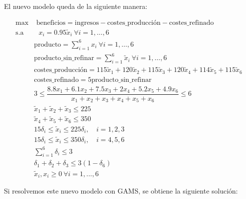 \documentclass[12pt,a4paper,twoside,openright,titlepage,final]{article}
\begin{document}
El nuevo modelo queda de la siguiente manera:

\begin{align*}
\max & \text{ beneficios} = \text{ingresos} - \text{costes\_producción} - \text{costes\_refinado}\\
\text{s.a} & \text{\ } x_i = 0.95\tilde{x}_i \ \forall i = 1, \dots, 6 \\
& \text{producto} = \sum_{i=1}^{6} x_i \ \forall i = 1, \dots, 6 \\
&\text{producto\_sin\_refinar} = \sum_{i=1}^{6} \tilde{x}_i \ \forall i = 1, \dots, 6\\
&\text{costes\_producción} = 115\tilde{x}_1 + 120\tilde{x}_2 + 115\tilde{x}_3 + 120\tilde{x}_4 + 114\tilde{x}_5 + 115\tilde{x}_6 \\
&\text{costes\_refinado} = 5\text{producto\_sin\_refinar} \\
& 3 \leq \dfrac{8.8x_1 + 6.1x_2 + 7.5x_3 + 2x_4 + 5.2x_5 + 4.9x_6}{x_1 + x_2 + x_3 + x_4 + x_5 + x_6} \leq 6\\
&\tilde{x}_1 + \tilde{x}_2 + \tilde{x}_3 \leq 225\\
&\tilde{x}_4 + \tilde{x}_5 + \tilde{x}_6 \leq 350\\
&15\delta_i \leq \tilde{x}_i \leq 225\delta_i, \quad i =1,2,3\\
&15\delta_i \leq \tilde{x}_i \leq 350\delta_i, \quad i =4,5,6 \\
&\sum_{i=1}^{6} \delta_i \leq 3\\
&\delta_1 + \delta_2 + \delta_3 \leq 3(1-\delta_6)\\
&\tilde{x}_i, x_i \geq 0 \ \forall i=1,...,6
\end{align*}

Si resolvemos este nuevo modelo con GAMS, se obtiene la siguiente solución:
\end{document}
